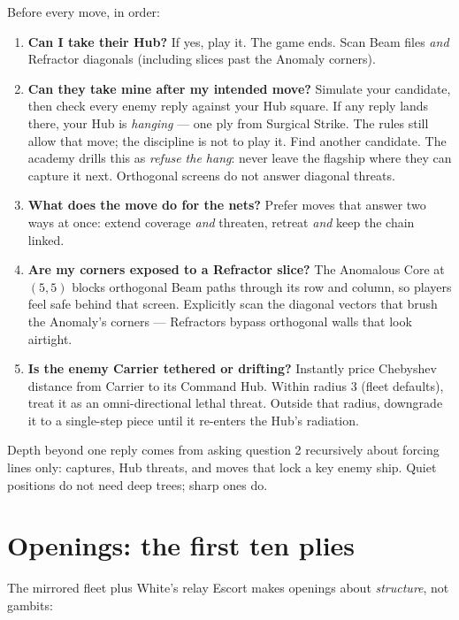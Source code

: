 \documentclass[11pt,a4paper]{article}
\begin{document}
Before every move, in order:

\begin{enumerate}
  \item \textbf{Can I take their Hub?} If yes, play it. The game ends. Scan
        Beam files \emph{and} Refractor diagonals (including slices past the
        Anomaly corners).
  \item \textbf{Can they take mine after my intended move?} Simulate your
        candidate, then check every enemy reply against your Hub square.
        If any reply lands there, your Hub is \emph{hanging} --- one ply from
        Surgical Strike. The rules still allow that move; the discipline is
        not to play it. Find another candidate. The academy drills this as
        \emph{refuse the hang}: never leave the flagship where they can
        capture it next. Orthogonal screens do not answer diagonal threats.
  \item \textbf{What does the move do for the nets?} Prefer moves that answer
        two ways at once: extend coverage \emph{and} threaten, retreat
        \emph{and} keep the chain linked.
  \item \textbf{Are my corners exposed to a Refractor slice?} The Anomalous
        Core at $(5,5)$ blocks orthogonal Beam paths through its row and
        column, so players feel safe behind that screen. Explicitly scan the
        diagonal vectors that brush the Anomaly's corners --- Refractors
        bypass orthogonal walls that look airtight.
  \item \textbf{Is the enemy Carrier tethered or drifting?} Instantly price
        Chebyshev distance from Carrier to its Command Hub. Within radius $3$
        (fleet defaults), treat it as an omni-directional lethal threat.
        Outside that radius, downgrade it to a single-step piece until it
        re-enters the Hub's radiation.
\end{enumerate}

Depth beyond one reply comes from asking question 2 recursively about forcing
lines only: captures, Hub threats, and moves that lock a key enemy ship.
Quiet positions do not need deep trees; sharp ones do.

\section{Openings: the first ten plies}

The mirrored fleet plus White's relay Escort makes openings about
\emph{structure}, not gambits:
\end{document}
